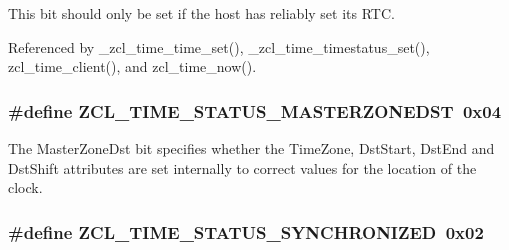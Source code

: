 This bit should only be set if the host has reliably set its R\-T\-C. 

Referenced by \-\_\-zcl\-\_\-time\-\_\-time\-\_\-set(), \-\_\-zcl\-\_\-time\-\_\-timestatus\-\_\-set(), zcl\-\_\-time\-\_\-client(), and zcl\-\_\-time\-\_\-now().

\hypertarget{group__zcl__time_ga76367e10cd6d032aad80cdd4786c1eca}{
\subsubsection[{Z\-C\-L\-\_\-\-T\-I\-M\-E\-\_\-\-S\-T\-A\-T\-U\-S\-\_\-\-M\-A\-S\-T\-E\-R\-Z\-O\-N\-E\-D\-S\-T}]{\setlength{\rightskip}{0pt plus 5cm}\#define Z\-C\-L\-\_\-\-T\-I\-M\-E\-\_\-\-S\-T\-A\-T\-U\-S\-\_\-\-M\-A\-S\-T\-E\-R\-Z\-O\-N\-E\-D\-S\-T~0x04}}\label{group__zcl__time_ga76367e10cd6d032aad80cdd4786c1eca}


The Master\-Zone\-Dst bit specifies whether the Time\-Zone, Dst\-Start, Dst\-End and Dst\-Shift attributes are set internally to correct values for the location of the clock. 

\hypertarget{group__zcl__time_ga07fc4fc7df3e8b1b44817bcaa50b7170}{
\subsubsection[{Z\-C\-L\-\_\-\-T\-I\-M\-E\-\_\-\-S\-T\-A\-T\-U\-S\-\_\-\-S\-Y\-N\-C\-H\-R\-O\-N\-I\-Z\-E\-D}]{\setlength{\rightskip}{0pt plus 5cm}\#define Z\-C\-L\-\_\-\-T\-I\-M\-E\-\_\-\-S\-T\-A\-T\-U\-S\-\_\-\-S\-Y\-N\-C\-H\-R\-O\-N\-I\-Z\-E\-D~0x02}}\label{group__zcl__time_ga07fc4fc7df3e8b1b44817bcaa50b7170}


